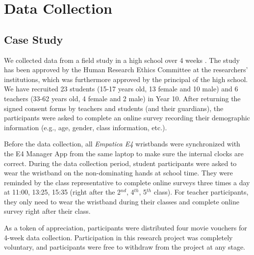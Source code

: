 \documentclass[sigconf]{acmart}
\begin{document}
\begin{comment}
\section{Research Questions}
\begin{itemize}
    \item RQ1: Is there correlation between quality of responses and survey completion time?
    \item RQ2: Can we infer the quality of self-report responses using EDA data?
    \item RQ3: Can we improve the prediction performance by selecting reliable self-report responses?
\end{itemize}
\end{comment}
\section{Data Collection}
\label{sec:Data collection}
\subsection{Case Study}
We collected data from a field study in a high school over 4 weeks \cite{gao2021understanding,gao2021ingauge}. The study has been approved by the Human Research Ethics Committee at the researchers' institutions, which was furthermore approved by the principal of the high school. We have recruited 23 students (15-17 years old, 13 female and 10 male) and 6 teachers (33-62 years old, 4 female and 2 male) in Year 10. After returning the signed consent forms by teachers and students (and their guardians), the participants were asked to complete an online survey recording their demographic information (e.g., age,  gender, class information, etc.). 

Before the data collection, all \textit{Empatica E4} wristbands  were synchronized with the E4 Manager App from the same laptop to make sure the internal clocks are correct. During the data collection period, student participants were asked to wear the wristband on the non-dominating hands at school time. They were reminded by the class representative to complete online surveys three times a day at 11:00, 13:25, 15:35 (right after the 2$^{nd}$, 4$^{th}$, 5$^{th}$ class). For teacher participants, they only need to wear the wristband during their classes and complete online survey right after their class. 

As a token of appreciation, participants were distributed four movie vouchers for 4-week data collection. Participation in this research project was completely voluntary, and participants were free to withdraw from the project at any stage.
\end{document}
